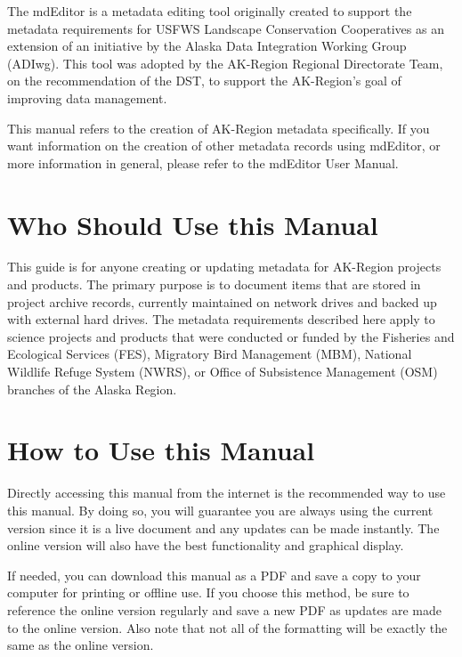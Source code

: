 \documentclass[
]{book}
\begin{document}
The mdEditor is a metadata editing tool originally created to support the metadata requirements for USFWS Landscape Conservation Cooperatives as an extension of an initiative by the Alaska Data Integration Working Group (ADIwg). This tool was adopted by the AK-Region Regional Directorate Team, on the recommendation of the DST, to support the AK-Region's goal of improving data management.

This manual refers to the creation of AK-Region metadata specifically. If you want information on the creation of other metadata records using mdEditor, or more information in general, please refer to the mdEditor User Manual.

\hypertarget{who-should-use-this-manual}{%
\section{Who Should Use this Manual}\label{who-should-use-this-manual}}

This guide is for anyone creating or updating metadata for AK-Region projects and products. The primary purpose is to document items that are stored in project archive records, currently maintained on network drives and backed up with external hard drives.
The metadata requirements described here apply to science projects and products that were conducted or funded by the Fisheries and Ecological Services (FES), Migratory Bird Management (MBM), National Wildlife Refuge System (NWRS), or Office of Subsistence Management (OSM) branches of the Alaska Region.

\hypertarget{how-to-use-this-manual}{%
\section{How to Use this Manual}\label{how-to-use-this-manual}}

Directly accessing this manual from the internet is the recommended way to use this manual. By doing so, you will guarantee you are always using the current version since it is a live document and any updates can be made instantly. The online version will also have the best functionality and graphical display.

If needed, you can download this manual as a PDF and save a copy to your computer for printing or offline use. If you choose this method, be sure to reference the online version regularly and save a new PDF as updates are made to the online version. Also note that not all of the formatting will be exactly the same as the online version.
\end{document}
